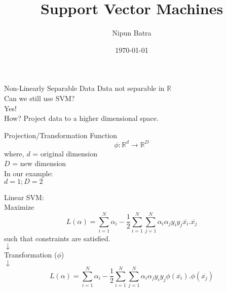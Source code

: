 \documentclass{beamer}
\title{Support Vector Machines}
\date{\today}
\author{Nipun Batra}
\institute{IIT Gandhinagar}
\begin{document}
	\maketitle
	
	\begin{frame}{Non-Linearly Separable Data}
	    Data not separable in $\mathbb{R}$ \\
	    \vspace{0.5cm}
	    Can we still use SVM? \\
	    \vspace{0.5cm}
	    Yes!\\
	    How? Project data to a higher dimensional space.
	\end{frame}
	\begin{frame}{Projection/Transformation Function}
	    \begin{equation*}
	        \phi : \mathbb{R}^{d} \rightarrow \mathbb{R}^{D}
	    \end{equation*}
	    where, $d$ = original dimension \\
	    \hspace{1cm} $D$ = new dimension \\
	    In our example:\\
	    \hspace{1cm} $d = 1; D = 2$ 
	\end{frame}
	\begin{frame}{}
	    Linear SVM:\\
	    \hspace{1cm} Maximize\\
	    \begin{equation*}
	        L(\alpha) = \sum_{i=1}^{N}\alpha_{i} - \frac{1}{2}\sum_{i=1}^{N}\sum_{j=1}^{N}\alpha_{i}\alpha_{j}y_{i}y_{j}\overline{x_{i}}.\overline{x_{j}}
	    \end{equation*}
	    \hspace{1cm} such that constraints are satisfied.\\
	   \hspace{5cm} $\downarrow$\\
	   \hspace{3.8cm} Transformation ($\phi$)\\
	   \hspace{5cm} $\downarrow$\\
	   \begin{equation*}
	       L(\alpha) = \sum_{i=1}^{N}\alpha_{i} - \frac{1}{2}\sum_{i=1}^{N}\sum_{j=1}^{N}\alpha_{i}\alpha_{j}y_{i}y_{j}\phi(\overline{x_{i}}).\phi(\overline{x_{j}})
	   \end{equation*}
	\end{frame}
\end{document}
